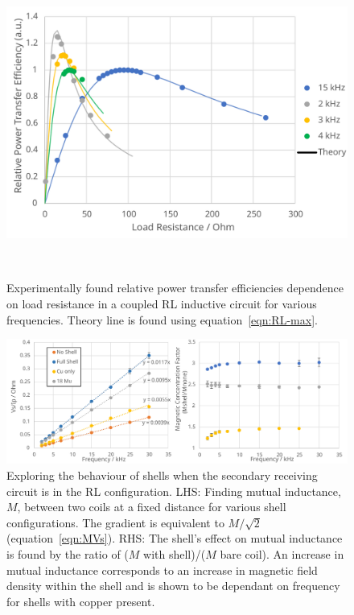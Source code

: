 \documentclass[11pt]{iopart}
\begin{document}
\begin{figure}
  \begin{center}
\hspace*{-2em}
  \begin{minipage}{0.5\linewidth}
   \noindent\includegraphics[width=\linewidth]{images/RL-Rpeaks.pdf}
  \end{minipage}
  ~~~
  \begin{minipage}{0.38\linewidth}
    \hspace*{-4em}\caption{}
    \small Experimentally found relative power transfer efficiencies
    dependence on load resistance in a coupled RL inductive circuit for
    various frequencies. Theory line is found using
    equation~\ref{eqn:RL-max}. \label{fig:RL-R}
  \end{minipage}
  \end{center}
\end{figure}

\begin{figure}
  \begin{center}
   \noindent\includegraphics[width=0.85\linewidth]{images/RL-graphs.pdf}
  \end{center}
  \caption{Exploring the behaviour of shells when the secondary
    receiving circuit is in the RL configuration. LHS: Finding mutual
    inductance, $M$, between two coils at a fixed distance for various
    shell configurations.  The gradient is equivalent to $M/\sqrt{2}$
    (equation~\ref{eqn:MVs}). RHS: The shell's effect on mutual
    inductance is found by the ratio of ($M$ with shell)/($M$ bare
    coil). An increase in mutual inductance corresponds to an increase
    in magnetic field density within the shell and is shown to be
    dependant on frequency for shells with copper
    present.}\label{fig:RL-F}
\end{figure}
\end{document}
